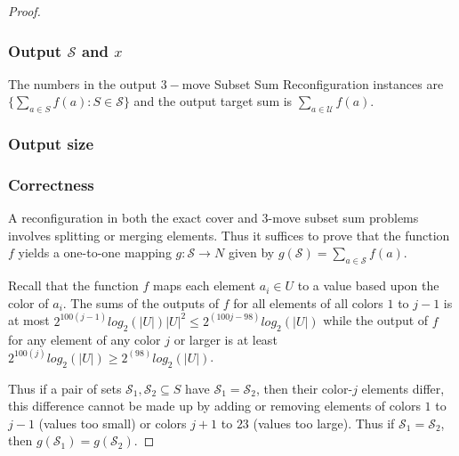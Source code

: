 \begin{proof}
\subsubsection{Output $\mathcal{S}$ and $x$}
The numbers in the output $3-$move Subset Sum Reconfiguration instances are $\{\sum_{a \in S} f(a) : S \in \mathcal{S}\}$ and the
output target sum is $\sum_{a \in \mathcal{U}} f(a)$.

\subsubsection{Output size}



\subsubsection{Correctness}
A reconﬁguration in both the exact cover and $3$-move subset sum problems involves splitting
or merging elements. Thus it suffices to prove that the function $f$ yields a one-to-one mapping $g : \mathcal{S} \rightarrow N$
given by $g(\mathcal{S}) = \sum_{a \in \mathcal{S}}^{} f(a)$.

Recall that the function $f$ maps each element $a_i \in U$ to a value based upon the color of $a_i$. The sums of
the outputs of $f$ for all elements of all colors $1$ to $j-1$ is at most $2^{100(j-1)} log_{2}(|U|)|U|^{2} \leq 2^{(100j-98)}log_{2}(|U|)$
while the output of $f$ for any element of any color $j$ or larger is at least $2^{100(j)} log_{2}(|U|) \geq 2^{(98)}log_{2}(|U|)$.

Thus if a pair of sets $\mathcal{S}_1, \mathcal{S}_2 \subseteq S$ have $\mathcal{S}_1 = \mathcal{S}_2$, then their color-$j$ elements
differ, this difference cannot be made up by adding or removing elements of colors $1$ to $j-1$ (values too small) or colors $j + 1$ to $23$
(values too large). Thus if $\mathcal{S}_1 = \mathcal{S}_2$, then $g(\mathcal{S}_1) = g(\mathcal{S}_2)$.


\end{proof}




